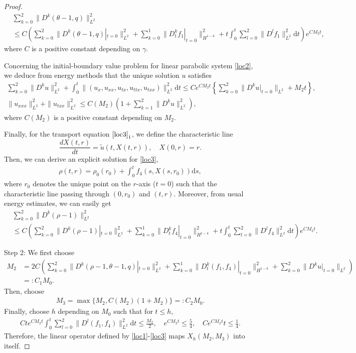 \documentclass[11pt,reqno]{amsart}
\numberwithin{equation}{section}
\newcommand{\dif}{\mathrm{d}}
\newcommand{\SUM}[3]{\sum\limits_{{#1}={#2}}^{#3}}
\begin{document}
\begin{proof}
 \begin{align*}
& \SUM k 0 2 \|D^k(\theta-1, q)\|_{L^2}^2 \\
 &\le C \left( \SUM k 0 2 \|D^k (\theta-1, q)|_{t=0}\|_{L^2}^2+\SUM k 0 1 \|D_t^k f_1|_{t=0}\|_{H^{1-k}}^2 + t \int_0^t \SUM l  0 2 \|D^l f_1\|_{L^2}^2 \dif t \right) e^{C M_2 t},
 \end{align*}
 where $C$ is a positive constant depending on $\gamma$.

 Concerning the initial-boundary value problem for linear parabolic system \eqref{loc2}, we deduce from energy methods that the unique solution $u$ satisfies
 \begin{align*}
 \SUM k 0 2  \|D^k  u\|_{L^2}^2+\int_0^t \|(u_x, u_{xx}, u_{tx}, u_{ttx}, u_{txx})\|_{L^2}^2 \dif t
 \le C e^{C M_2 t} \left\{ \SUM k 0 2 \|D^k  u|_{t=0}\|_{L^2} +M_2 t \right\},\\
 \|u_{xxx}\|_{L^2}^2+\| u_{txx}\|_{L^2}^2\le C(M_2)(1+ \SUM k 1 2 \|D^k u\|_{L^2}^2 ),
 \end{align*}
 where $C(M_2)$ is a positive constant depending on $M_2$.

 Finally, for the transport equation $\eqref{loc3}_1$, we define the characteristic line
 \[
 \frac{d X(t,r)}{d t}= \tilde u(t, X(t,r)), \quad X(0,r)=r.
 \]
 Then, we can derive an explicit  solution for \eqref{loc3},
 \begin{align}
 \rho(t,r)=\rho_0(r_0)+\int_0^t f_4(s, X(s, r_0)) \dif s ,
 \end{align}
 where $r_0$ denotes the unique point on the $r$-axis ($t=0$) such that the characteristic line passing through $(0, r_0)$ and $(t, r)$. Moreover,
 from usual energy estimates, we can easily get
  \begin{align*}
& \SUM k 0 2 \|D^k(\rho-1)\|_{L^2}^2 \\
 &\le C \left( \SUM k 0 2 \|D^k (\rho-1)|_{t=0}\|_{L^2}^2+\SUM k 0 1 \|D_t^k f_4|_{t=0}\|_{H^{1-k}}^2 + t \int_0^t \SUM l  0 2 \|D^l f_4\|_{L^2}^2 \dif t \right) e^{C M_2 t}.
 \end{align*}

Step 2: We first choose
 \begin{align*}
 M_2
 &=2C \left( \SUM k 0 2 \|D^k (\rho-1, \theta-1, q)|_{t=0}\|_{L^2}^2+\SUM k 0 1 \|D_t^k (f_1, f_4)|_{t=0}\|_{H^{1-k}}^2+\SUM k 0 2 \|D^k  u|_{t=0}\|_{L^2}  \right) \\
 &=:C_1 M_0.
 \end{align*}
 Then, choose
 \begin{align*}
 M_3=\max \{M_2,  C(M_2)(1+M_2)\}=:C_2 M_0.
 \end{align*}
 Finally, choose $h$ depending on $M_0$ such that for $t\le h$,
 \begin{align*}
 C  t  e^{C M_2 t}  \int_0^t \SUM l  0 2 \|D^l (f_1, f_4)\|_{L^2}^2 \dif t  \le \frac{M_2}{2}, \quad
 e^{C M_2 t}  \le \frac{5}{4},  \quad
 C e^{C M_2 t}  t \le \frac{1}{4}.
 \end{align*}
 Therefore, the linear operator defined by \eqref{loc1}-\eqref{loc3} maps $X_h(M_2, M_3)$ into itself.


\end{proof}
\end{document}
